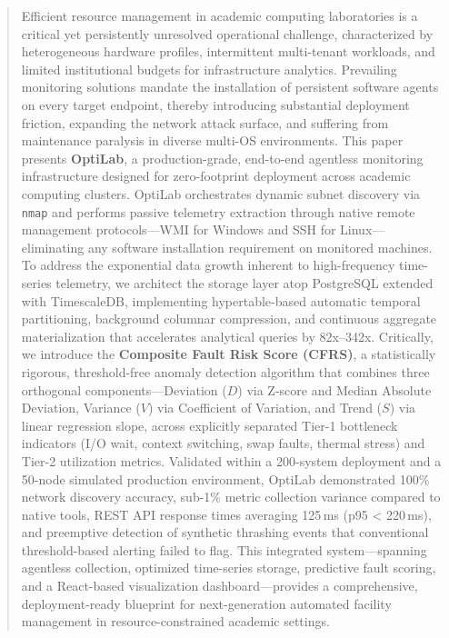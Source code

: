 \documentclass{ieeeaccess}
\begin{document}
\begin{abstract}
Efficient resource management in academic computing laboratories is a critical yet persistently unresolved operational challenge, characterized by heterogeneous hardware profiles, intermittent multi-tenant workloads, and limited institutional budgets for infrastructure analytics. Prevailing monitoring solutions mandate the installation of persistent software agents on every target endpoint, thereby introducing substantial deployment friction, expanding the network attack surface, and suffering from maintenance paralysis in diverse multi-OS environments. This paper presents \textbf{OptiLab}, a production-grade, end-to-end agentless monitoring infrastructure designed for zero-footprint deployment across academic computing clusters. OptiLab orchestrates dynamic subnet discovery via \texttt{nmap} and performs passive telemetry extraction through native remote management protocols---WMI for Windows and SSH for Linux---eliminating any software installation requirement on monitored machines. To address the exponential data growth inherent to high-frequency time-series telemetry, we architect the storage layer atop PostgreSQL extended with TimescaleDB, implementing hypertable-based automatic temporal partitioning, background columnar compression, and continuous aggregate materialization that accelerates analytical queries by 82x--342x. Critically, we introduce the \textbf{Composite Fault Risk Score (CFRS)}, a statistically rigorous, threshold-free anomaly detection algorithm that combines three orthogonal components---Deviation ($D$) via Z-score and Median Absolute Deviation, Variance ($V$) via Coefficient of Variation, and Trend ($S$) via linear regression slope, across explicitly separated Tier-1 bottleneck indicators (I/O wait, context switching, swap faults, thermal stress) and Tier-2 utilization metrics. Validated within a 200-system deployment and a 50-node simulated production environment, OptiLab demonstrated 100\% network discovery accuracy, sub-1\% metric collection variance compared to native tools, REST API response times averaging 125\,ms (p95 < 220\,ms), and preemptive detection of synthetic thrashing events that conventional threshold-based alerting failed to flag. This integrated system---spanning agentless collection, optimized time-series storage, predictive fault scoring, and a React-based visualization dashboard---provides a comprehensive, deployment-ready blueprint for next-generation automated facility management in resource-constrained academic settings.
\end{abstract}
\end{document}
